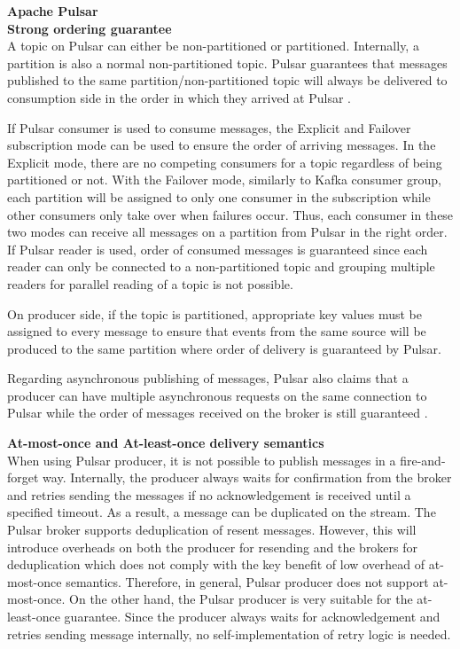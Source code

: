 \large \textbf{Apache Pulsar}\\
\normalsize
\textbf{Strong ordering guarantee}\\
A topic on Pulsar can either be non-partitioned or partitioned. Internally, a partition is also a normal non-partitioned topic. Pulsar guarantees that messages published to the same partition/non-partitioned topic will always be delivered to consumption side in the order in which they arrived at Pulsar \cite{pulsarconceptmessaging}.

If Pulsar consumer is used to consume messages, the Explicit and Failover subscription mode can be used to ensure the order of arriving messages. In the Explicit mode, there are no competing consumers for a topic regardless of being partitioned or not. With the Failover mode, similarly to Kafka consumer group, each partition will be assigned to only one consumer in the subscription while other consumers only take over when failures occur. Thus, each consumer in these two modes can receive all messages on a partition from Pulsar in the right order. If Pulsar reader is used, order of consumed messages is guaranteed since each reader can only be connected to a non-partitioned topic and grouping multiple readers for parallel reading of a topic is not possible. 

On producer side, if the topic is partitioned, appropriate key values must be assigned to every message to ensure that events from the same source will be produced to the same partition where order of delivery is guaranteed by Pulsar.

Regarding asynchronous publishing of messages, Pulsar also claims that a producer can have multiple asynchronous requests on the same connection to Pulsar while the order of messages received on the broker is still guaranteed \cite{pulsarinflight}.

\textbf{At-most-once and At-least-once delivery semantics}\\
When using Pulsar producer, it is not possible to publish messages in a fire-and-forget way. Internally, the producer always waits for confirmation from the broker and retries sending the messages if no acknowledgement is received until a specified timeout. As a result, a message can be duplicated on the stream. The Pulsar broker supports deduplication of resent messages. However, this will introduce overheads on both the producer for resending and the brokers for deduplication which does not comply with the key benefit of low overhead of at-most-once semantics. Therefore, in general, Pulsar producer does not support at-most-once. On the other hand, the Pulsar producer is very suitable for the at-least-once guarantee. Since the producer always waits for acknowledgement and retries sending message internally, no self-implementation of retry logic is needed.  

